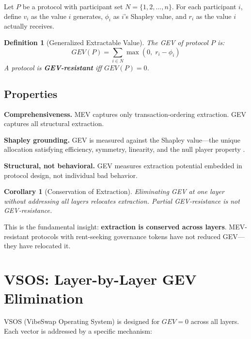 \documentclass[11pt, a4paper]{article}
\newtheorem{definition}{Definition}
\newtheorem{corollary}{Corollary}
\begin{document}
Let $P$ be a protocol with participant set $N = \{1, 2, \ldots, n\}$. For each participant $i$, define $v_i$ as the value $i$ generates, $\phi_i$ as $i$'s Shapley value, and $r_i$ as the value $i$ actually receives.

\begin{definition}[Generalized Extractable Value]
The GEV of protocol $P$ is:
\begin{equation}
    GEV(P) = \sum_{i \in N} \max(0,\; r_i - \phi_i)
    \label{eq:gev}
\end{equation}
A protocol is \textbf{GEV-resistant} iff $GEV(P) = 0$.
\end{definition}

\subsection{Properties}

\textbf{Comprehensiveness.} MEV captures only transaction-ordering extraction. GEV captures all structural extraction.

\textbf{Shapley grounding.} GEV is measured against the Shapley value---the unique allocation satisfying efficiency, symmetry, linearity, and the null player property \citep{shapley1953}.

\textbf{Structural, not behavioral.} GEV measures extraction potential embedded in protocol design, not individual bad behavior.

\begin{corollary}[Conservation of Extraction]
Eliminating GEV at one layer without addressing all layers relocates extraction. Partial GEV-resistance is not GEV-resistance.
\end{corollary}

This is the fundamental insight: \textbf{extraction is conserved across layers}. MEV-resistant protocols with rent-seeking governance tokens have not reduced GEV---they have relocated it.

\section{VSOS: Layer-by-Layer GEV Elimination}

VSOS (VibeSwap Operating System) is designed for $GEV = 0$ across all layers. Each vector is addressed by a specific mechanism:
\end{document}
